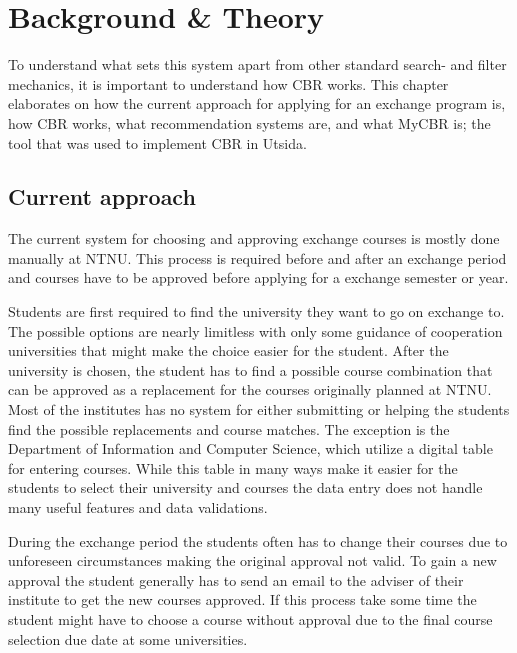 \cleardoublepage

\chapter{Background \& Theory}

To understand what sets this system apart from other standard search- and filter mechanics, it is important to understand how CBR works. This chapter elaborates on how the current approach for applying for an exchange program is, how CBR works, what recommendation systems are, and what MyCBR is; the tool that was used to implement CBR in Utsida.

\section{Current approach}
The current system for choosing and approving exchange courses is mostly done manually at NTNU. This process is required before and after an exchange period and courses have to be approved before applying for a exchange semester or year.

Students are first required to find the university they want to go on exchange to. The possible options are nearly limitless with only some guidance of cooperation universities that might make the choice easier for the student. After the university is chosen, the student has to find a possible course combination that can be approved as a replacement for the courses originally planned at NTNU. Most of the institutes has no system for either submitting or helping the students find the possible replacements and course matches. The exception is the Department of Information and Computer Science, which utilize a digital table for entering courses. While this table in many ways make it easier for the students to select their university and courses the data entry does not handle many useful features and data validations. 

During the exchange period the students often has to change their courses due to unforeseen circumstances making the original approval not valid. To gain a new approval the student generally has to send an email to the adviser of their institute to get the new courses approved. If this process take some time the student might have to choose a course without approval due to the final course selection due date at some universities. 



